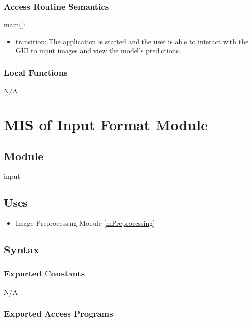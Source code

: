 \documentclass[12pt, titlepage]{article}
\begin{document}
\subsubsection{Access Routine Semantics}

\noindent main():
\begin{itemize}
\item transition: The application is started and the user is able to interact
with the GUI to input images and view the model's predictions.
\end{itemize}


\subsubsection{Local Functions}

N/A

\newpage
\section{MIS of Input Format Module} \label{MInput}

\subsection{Module}

input

\subsection{Uses}

\begin{itemize}
  \item Image Preprocessing Module \ref{mPreprocessing}
\end{itemize}

\subsection{Syntax}

\subsubsection{Exported Constants}

N/A

\subsubsection{Exported Access Programs}
\end{document}
